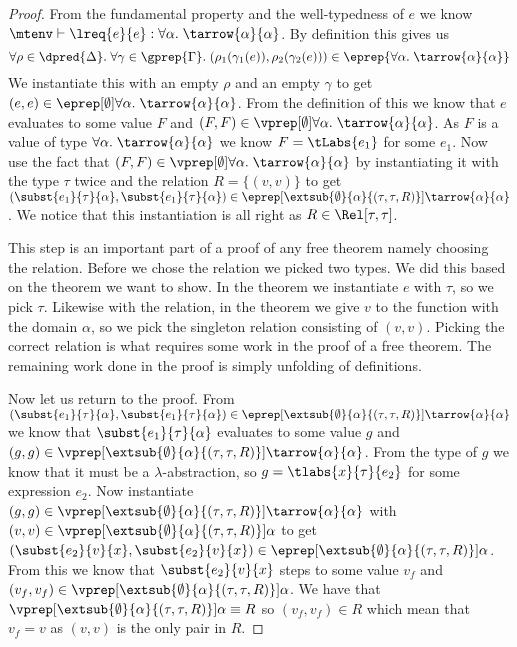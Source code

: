 \begin{proof}
\newcommand{\aaa}{\ensuremath{\forall \alpha. \; \tarrow{\alpha}{\alpha}}}
From the fundamental property and the well-typedness of $e$ we know $\mtenv \vdash \lreq{e}{e} : \aaa$. By definition this gives us
\[
\forall \rho \in \dpred{\Delta}. \; \forall \gamma \in \gprep{\Gamma}. \; (\rho_1(\gamma_1(e)),\rho_2(\gamma_2(e))) \in \eprep{\aaa}
\]
\newcommand{\mt}{\ensuremath{\emptyset}}
We instantiate this with an empty $\rho$ and an empty $\gamma$ to get $(e,e) \in \eprep[\mt]{\aaa}$. From the definition of this we know that $e$ evaluates to some value $F$ and $(F,F) \in \vprep[\mt]{\aaa}$. As $F$ is a value of type \aaa{} we know $F=\tLabs{e_1}$ for some $e_1$. Now use the fact that $(F,F) \in \vprep[\mt]{\aaa}$ by instantiating it with the type $\tau$ twice and the relation $R=\{(v,v)\}$ to get
\newcommand{\env}{\ensuremath{\extsub{\mt}{\alpha}{(\tau,\tau,R)}}}
\newcommand{\taa}{\ensuremath{\tarrow{\alpha}{\alpha}}}
$(\subst{e_1}{\tau}{\alpha},\subst{e_1}{\tau}{\alpha})\in \eprep[\env]{\taa}$. We notice that this instantiation is all right as $R \in \Rel[\tau,\tau]$.

This step is an important part of a proof of any free theorem namely choosing the relation. Before we chose the relation we picked two types. We did this based on the theorem we want to show. In the theorem we instantiate $e$ with $\tau$, so we pick $\tau$. Likewise with the relation, in the theorem we give $v$ to the function with the domain $\alpha$, so we pick the singleton relation consisting of $(v,v)$. Picking the correct relation is what requires some work in the proof of a free theorem. The remaining work done in the proof is simply unfolding of definitions.

Now let us return to the proof. From $(\subst{e_1}{\tau}{\alpha},\subst{e_1}{\tau}{\alpha})\in \eprep[\env]{\taa}$ we know that $\subst{e_1}{\tau}{\alpha}$ evaluates to some value $g$ and $(g,g)\in \vprep[\env]{\taa}$. From the type of $g$ we know that it must be a $\lambda$-abstraction, so $g=\tlabs{x}{\tau}{e_2}$ for some expression $e_2$. Now instantiate $(g,g)\in \vprep[\env]{\taa}$ with $(v,v) \in \vprep[\env]{\alpha}$ to get $(\subst{e_2}{v}{x},\subst{e_2}{v}{x}) \in \eprep[\env]{\alpha}$. From this we know that $\subst{e_2}{v}{x}$ steps to some value $v_f$ and $(v_f,v_f) \in \vprep[\env]{\alpha}$. We have that $\vprep[\env]{\alpha} \equiv R$ so $(v_f,v_f) \in R$ which mean that $v_f = v$ as $(v,v)$ is the only pair in $R$.


\end{proof}
